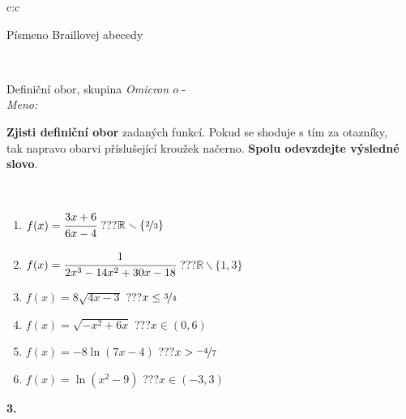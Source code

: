\documentclass[10pt]{report}
\newcommand\omicron{o}
\begin{document}
\begin{tabular}{c:c}
\begin{minipage}[c][104.5mm][t]{0.5\linewidth}
\begin{center}
\begin{minipage}{0.20\linewidth}
\begin{center}
{\small Písmeno Braillovej abecedy}
\end{center}
\end{minipage}
\end{center}
\end{minipage}
\\ \hdashline
\begin{minipage}[c][104.5mm][t]{0.5\linewidth}
\begin{center}
\vspace{7mm}
{\huge Definiční obor, skupina \textit{Omicron $\omicron$} -}\\[5mm]
\textit{Meno:}\phantom{xxxxxxxxxxxxxxxxxxxxxxxxxxxxxxxxxxxxxxxxxxxxxxxxxxxxxxxxxxxxxxxxx}\\[5mm]
\begin{minipage}{0.95\linewidth}
\textbf{Zjisti definiční obor} zadaných funkcí. Pokud se shoduje s tím za otazníky,\\tak napravo obarvi příslušející kroužek načerno. \textbf{Spolu odevzdejte výsledné slovo}.
\end{minipage}
\\[1mm]
\begin{minipage}{0.79\linewidth}
\begin{center}
\begin{varwidth}{\linewidth}
\begin{enumerate}
\normalsizerrr
\item $f(x)=\cfrac{3x+6}{6x-4}$\quad \dotfill\; ???\;\dotfill \quad $\mathbb{R}\smallsetminus\{\nicefrac{2}{3}\}$
\item $f(x)=\cfrac{1}{2x^3-14x^2+30x-18}$\quad \dotfill\; ???\;\dotfill \quad $\mathbb{R}\smallsetminus\{1,3\}$
\item $f(x)=8\sqrt{4x-3}$\quad \dotfill\; ???\;\dotfill \quad $x\leq\nicefrac{3}{4}$
\item $f(x)=\sqrt{-x^2+6x}$\quad \dotfill\; ???\;\dotfill \quad $x\in(0 , 6)$
\item $f(x)=-8\ln{(7x-4)}$\quad \dotfill\; ???\;\dotfill \quad $x>\nicefrac{-4}{7}$
\item $f(x)=\ln{(x^2-9)}$\quad \dotfill\; ???\;\dotfill \quad $x\in(-3 , 3)$
\end{enumerate}
\end{varwidth}
\end{center}
\end{minipage}
\begin{minipage}{0.20\linewidth}
\begin{center}
{\Huge\bfseries 3.} \\[2mm]

\end{center}
\end{minipage}
\end{center}
\end{minipage}
\end{tabular}
\end{document}

